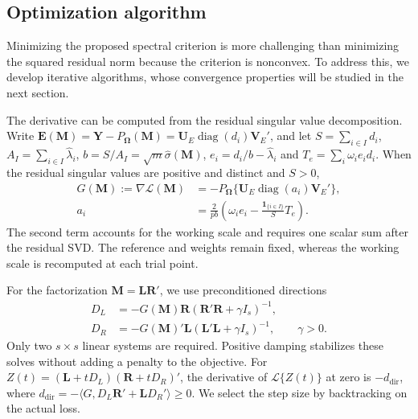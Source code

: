 \documentclass[numsec,webpdf,modern,large,namedate]{oup-authoring-template}
\theoremstyle{plain}
\theoremstyle{remark}
\newcommand{\M}{\bm{M}}
\newcommand{\Y}{\bm{Y}}
\newcommand{\bOmega}{\bm{\Omega}}
\newcommand{\U}{\bm{U}}
\newcommand{\V}{\bm{V}}
\newcommand{\bL}{\bm{L}}
\newcommand{\R}{\bm{R}}
\newif\ifmarkchanges
\newenvironment{revision}{\begingroup\ifmarkchanges\color{red}\fi}{\endgroup}
\begin{document}
\begin{revision}
\subsection{Optimization algorithm}
Minimizing the proposed spectral criterion is more challenging than minimizing the squared residual norm because the criterion is nonconvex. To address this, we develop iterative algorithms, whose convergence properties will be studied in the next section.

The derivative can be computed from the residual singular value decomposition. Write
$\bm E(\M)=\Y-P_{\bOmega}(\M)
 =\U_E\operatorname{diag}(d_i)\V_E'$, and let
$S=\sum_{i\in I}d_i$, $A_I=\sum_{i\in I}\widehat\lambda_i$,
$b=S/A_I=\sqrt m\widehat\sigma(\M)$,
$e_i=d_i/b-\widehat\lambda_i$ and $T_e=\sum_i\omega_i e_i d_i$.
When the residual singular values are positive and distinct and $S>0$,
\begin{align}
 G(\M):=\nabla\mathcal L(\M)
 &=-P_{\bOmega}\{\U_E\operatorname{diag}(a_i)\V_E'\},\nonumber\\
 a_i&=\frac{2}{pb}\left(\omega_i e_i-
             \frac{\mathbf1_{\{i\in I\}}}{S}T_e\right).
 \label{eq:gradient_for_our}
\end{align}
The second term accounts for the working scale and requires one scalar
sum after the residual SVD. The reference and weights remain fixed,
whereas the working scale is recomputed at each trial point.

For the factorization $\M=\bL\R'$, we use preconditioned directions
\begin{align}
 D_L&=-G(\M)\R(\R'\R+\gamma I_s)^{-1},\nonumber\\
 D_R&=-G(\M)'\bL(\bL'\bL+\gamma I_s)^{-1},\qquad\gamma>0.
 \label{eq:main_factor_direction}
\end{align}
Only two $s\times s$ linear systems are required. Positive damping
stabilizes these solves without adding a penalty to the objective.
For $Z(t)=(\bL+tD_L)(\R+tD_R)'$, the derivative of
$\mathcal L\{Z(t)\}$ at zero is $-d_{\mathrm{dir}}$, where
$d_{\mathrm{dir}}=-\langle G,D_L\R'+\bL D_R'\rangle\ge0$.
We select the step size by backtracking on the actual loss.


\end{revision}
\end{document}
